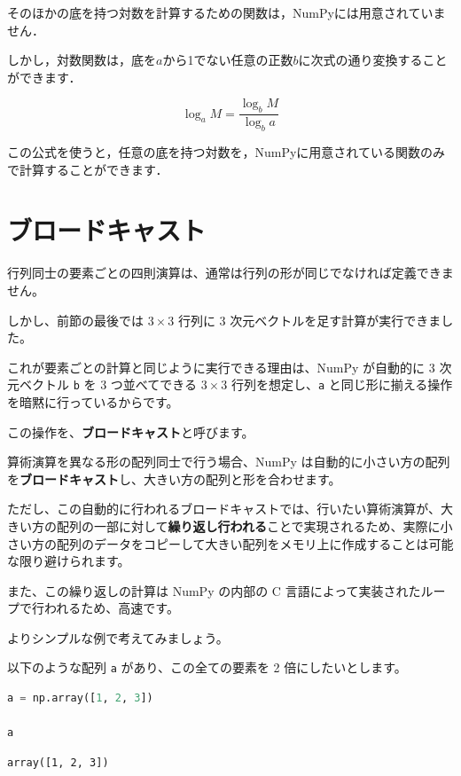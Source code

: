 
そのほかの底を持つ対数を計算するための関数は，NumPyには用意されていません．

しかし，対数関数は，底を$a$から1でない任意の正数$b$に次式の通り変換することができます．

\[
\log_a M = \frac{\log_b M}{\log_b a}
\]

この公式を使うと，任意の底を持つ対数を，NumPyに用意されている関数のみで計算することができます．


\section{ブロードキャスト}


行列同士の要素ごとの四則演算は、通常は行列の形が同じでなければ定義できません。

しかし、前節の最後では $3 \times 3$ 行列に 3 次元ベクトルを足す計算が実行できました。


これが要素ごとの計算と同じように実行できる理由は、NumPy が自動的に 3 次元ベクトル \texttt{b} を 3 つ並べてできる $3 \times 3$ 行列を想定し、\texttt{a} と同じ形に揃える操作を暗黙に行っているからです。

この操作を、\textbf{ブロードキャスト}と呼びます。


算術演算を異なる形の配列同士で行う場合、NumPy は自動的に小さい方の配列を\textbf{ブロードキャスト}し、大きい方の配列と形を合わせます。

ただし、この自動的に行われるブロードキャストでは、行いたい算術演算が、大きい方の配列の一部に対して\textbf{繰り返し行われる}ことで実現されるため、実際に小さい方の配列のデータをコピーして大きい配列をメモリ上に作成することは可能な限り避けられます。

また、この繰り返しの計算は NumPy の内部の C 言語によって実装されたループで行われるため、高速です。


よりシンプルな例で考えてみましょう。

以下のような配列 \texttt{a} があり、この全ての要素を 2 倍にしたいとします。


\begin{lstlisting}[style=codecell,language=Python]
a = np.array([1, 2, 3])

a
\end{lstlisting}

\begin{lstlisting}[style=outputcell]
array([1, 2, 3])
\end{lstlisting}

